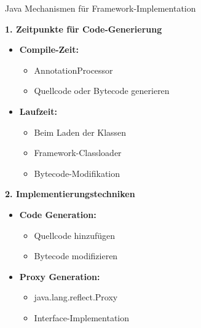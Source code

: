 \begin{KR}{Java Mechanismen für Framework-Implementation}

    \begin{minipage}[t]{0.55\textwidth}
\textbf{1. Zeitpunkte für Code-Generierung}
\begin{itemize}
    \item \textbf{Compile-Zeit:}
    \begin{itemize}
        \item AnnotationProcessor
        \item Quellcode oder Bytecode generieren
    \end{itemize}
    \item \textbf{Laufzeit:}
    \begin{itemize}
        \item Beim Laden der Klassen
        \item Framework-Classloader
        \item Bytecode-Modifikation
    \end{itemize}
\end{itemize}
\end{minipage}
\begin{minipage}[t]{0.45\textwidth}
\textbf{2. Implementierungstechniken}
\begin{itemize}
    \item \textbf{Code Generation:}
    \begin{itemize}
        \item Quellcode hinzufügen
        \item Bytecode modifizieren
    \end{itemize}
    \item \textbf{Proxy Generation:}
    \begin{itemize}
        \item java.lang.reflect.Proxy
        \item Interface-Implementation
    \end{itemize}
\end{itemize}
\end{minipage}
\end{KR}

